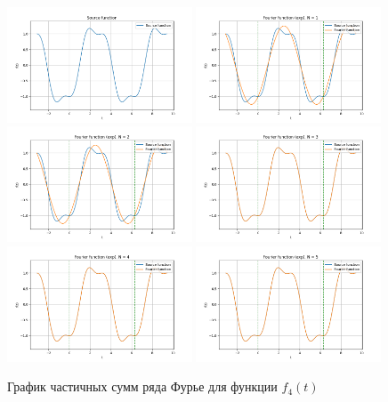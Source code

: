 \begin{figure}[ht!]
    \centering
    \includegraphics[width=0.49\textwidth]{media/plots/func_4_exp.png}
    \includegraphics[width=0.49\textwidth]{media/plots/func_4_exp_N_1.png}
    \includegraphics[width=0.49\textwidth]{media/plots/func_4_exp_N_2.png}
    \includegraphics[width=0.49\textwidth]{media/plots/func_4_exp_N_3.png}
    \includegraphics[width=0.49\textwidth]{media/plots/func_4_exp_N_4.png}
    \includegraphics[width=0.49\textwidth]{media/plots/func_4_exp_N_5.png}
    \caption{График частичных сумм ряда Фурье для функции $f_4(t)$}
    \label{fig:func_4_plot_exp}
\end{figure}

